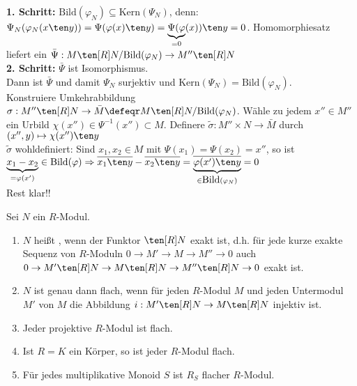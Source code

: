 \begin{Bew} 
  \textbf{1. Schritt:} $\mbox{Bild}(\varphi_N) \subseteq \mbox{Kern}(\Psi_N)$,
  denn: $\Psi_N(\varphi_N(x \ten y)) = \Psi(\varphi(x) \ten y) =
  \underset{=0}{\underbrace{\Psi(\varphi}}(x)) \ten y = 0$. Homomorphiesatz
  liefert ein $\bar{\Psi}: M \ten[R] N/\mbox{Bild}(\varphi_N) \to M'' \ten[R]
  N$\\
  \textbf{2. Schritt:} $\bar{\Psi}$ ist Isomorphismus.\\
  Dann ist $\bar{\Psi}$ und damit $\Psi_N$ surjektiv und $\mbox{Kern}(\Psi_N) =
  \mbox{Bild}(\varphi_N)$.\\
  Konstruiere Umkehrabbildung $\sigma: M'' \ten[R] N \to \bar{M} \defeqr M
  \ten[R] N/\mbox{Bild}(\varphi_N)$. Wähle zu jedem $x'' \in M''$ ein Urbild
  $\chi(x'') \in \Psi^{-1}(x'') \subset M$.
  Definere $\tilde{\sigma}: M'' \times N \to \bar{M}$ durch $(x'', y) \mapsto
  \chi(x'') \ten y$\\
  $\tilde{\sigma}$ wohldefiniert:
  Sind $x_1,x_2 \in M$ mit $\Psi(x_1) = \Psi(x_2) = x''$, so ist $\underset{= \varphi(x')
  }{\underbrace{x_1 - x_2}} \in \mbox{Bild}(\varphi) \Rightarrow \overline{x_1
  \ten y} - \overline{x_2 \ten y} = \underset{\in \mbox{Bild}(\varphi_N)
  }{\underbrace{\overline{\varphi(x') \ten y}}} = 0$\\
  Rest klar!!
\end{Bew}


\begin{DefProp}
\label{1.13}
  Sei $N$ ein $R$-Modul.
  \begin{enumerate}
    \item $N$ hei\ss t , wenn der Funktor $\ten[R] N$ exakt ist,
    d.h. f\"ur jede kurze exakte Sequenz von $R$-Moduln 
    $0\to M'\to M\to M''\to 0$
    auch $0\to M'\ten[R] N\to M\ten[R] N\to M''\ten[R] N\to 0$ exakt ist.
    \item $N$ ist genau dann flach, wenn f\"ur jeden $R$-Modul $M$ und jeden Untermodul $M'$ von $M$
    die Abbildung $i:M'\ten[R] N\to M\ten[R] N$ injektiv ist.
    \item Jeder projektive $R$-Modul ist flach.
    \item Ist $R=K$ ein K\"orper, so ist jeder $R$-Modul flach.
    \item F\"ur jedes multiplikative Monoid $S$ ist $R_S$ flacher $R$-Modul.
  \end{enumerate}
\end{DefProp}

